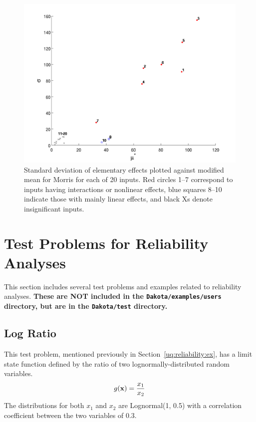 \begin{figure}[ht!]
\centering
\includegraphics[width=\textwidth]{images/moat_mustar_sigma}
\caption{\label{FIG:mustar_sigma} Standard deviation of elementary
effects plotted against modified mean for Morris for each of 20
inputs. Red circles 1--7 correspond to inputs having interactions or
nonlinear effects, blue squares 8--10 indicate those with mainly
linear effects, and black Xs denote insignificant inputs.}
\end{figure}

\clearpage
\section{Test Problems for Reliability Analyses}\label{additional:reliabilityproblems}
This section includes several test problems and examples related to
reliability analyses. {\bf These are NOT included in the {\tt Dakota/examples/users}
directory, but are in the {\tt Dakota/test} directory.}


\subsection{Log Ratio}\label{additional:logratio}

This test problem, mentioned previously in
Section~\ref{uq:reliability:ex}, has a limit state function defined by
the ratio of two lognormally-distributed random variables.
\begin{equation}
g({\bf x}) = \frac{x_1}{x_2}
\end{equation}
The distributions for both $x_1$ and $x_2$ are Lognormal(1, 0.5) with
a correlation coefficient between the two variables of 0.3.

